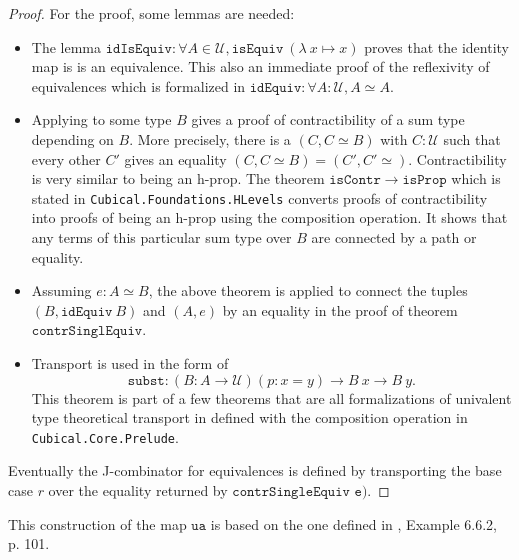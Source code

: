 \documentclass[12pt,a4paper,twoside,xetex]{book} %
\newcommand{\op}[1]{\mathtt{#1}}
\newcommand{\type}{\mathcal{U}}
\begin{document}
\begin{proof}

For the proof, some lemmas are needed: 
\begin{itemize}

\item The lemma $\op{idIsEquiv}: \forall A \in \type , \op{isEquiv} \  
(\lambda \ x \mapsto x)$ proves that the identity map is is an equivalence. This also an immediate proof of the reflexivity of equivalences which is formalized in  $\op{idEquiv}: \forall A : \type, A 
\simeq A$.

\item Applying  to some type $B$ gives a proof of 
contractibility of a sum type depending on $B$. More precisely, there is a $(C, 
C \simeq B)$ with $C:\mathcal{U}$ such that every other $C'$ gives an equality 
$(C,C \simeq B) = (C',C'\simeq)$. Contractibility is very similar to being an 
h-prop. The theorem $\op{isContr} \rightarrow \op{isProp}$ which is stated in 
\texttt{Cubical.Foundations.HLevels} converts proofs of contractibility into 
proofs of being an h-prop using the composition operation. It shows that any 
terms of this particular sum type over $B$ are connected by a path or equality.


\item   Assuming $e : A \simeq B$, the above theorem is applied to connect the 
tuples $(B, \op{idEquiv} \ B)$ and $(A, e)$ by an equality in the proof of 
theorem $\op{contrSinglEquiv}$.

\item Transport is used in the form of $$\op{subst} : \left(B : A \rightarrow \type 
\right) (p : x = y) \rightarrow B \ x \rightarrow B \ y.$$ This theorem is part 
of a few theorems that are all formalizations of univalent type theoretical 
transport in defined with the composition operation in 
\texttt{Cubical.Core.Prelude}.

\end{itemize}

Eventually the J-combinator for equivalences is defined by transporting the 
base case $r$ over the equality returned by $\texttt{contrSingleEquiv e)}$.

\end{proof}

This construction of the map $\op{ua}$ is based on the one defined in 
\cite{Huber2016}, Example 6.6.2, p. 101.
\end{document}
